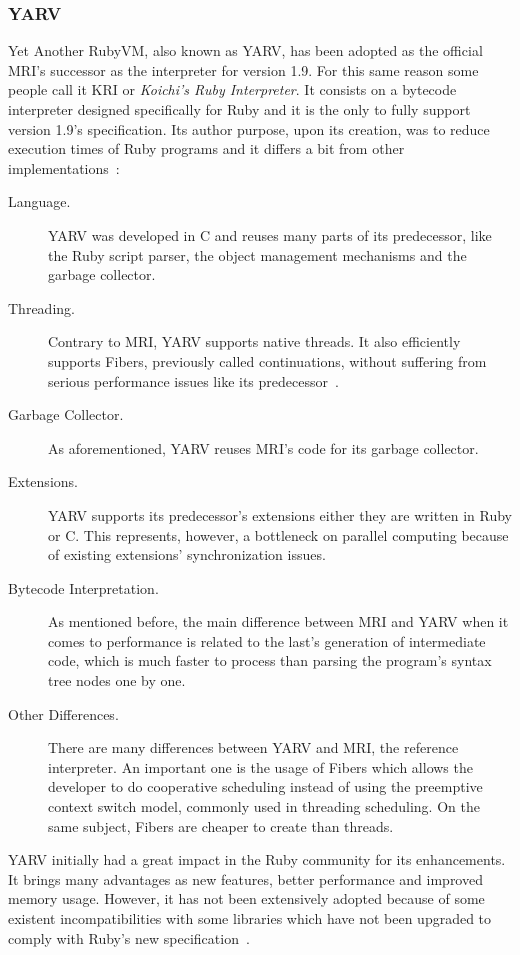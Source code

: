 \subsubsection{YARV}
Yet Another RubyVM, also known as YARV, has been adopted as the official MRI's successor as the interpreter for version 1.9. For this same reason some people call it KRI or \textit{Koichi's Ruby Interpreter}. It consists on a bytecode interpreter designed specifically for Ruby and it is the only to fully support version 1.9's specification. Its author purpose, upon its creation, was to reduce execution times of Ruby programs and it differs a bit from other implementations~\cite{yarv, rubyvm_interview, ruby_intermediate_language}:
\begin{description}
\item[Language.] YARV was developed in C and reuses many parts of its predecessor, like the Ruby script parser, the object management mechanisms and the garbage collector.
\item[Threading.] Contrary to MRI, YARV supports native threads. It also efficiently supports Fibers, previously called continuations, without suffering from serious performance issues like its predecessor~\cite{memory_leak_fix_18X}.
\item[Garbage Collector.]  As aforementioned, YARV reuses MRI's code for its garbage collector.
\item[Extensions.]  YARV supports its predecessor's extensions either they are written in Ruby or C. This represents, however, a bottleneck on parallel computing because of existing extensions' synchronization issues.
\item[Bytecode Interpretation.] As mentioned before, the main difference between MRI and YARV when it comes to performance is related to the last's generation of intermediate code, which is much faster to process than parsing the program's syntax tree nodes one by one.
\item[Other Differences.] There are many differences between YARV and MRI, the reference interpreter. An important one is the usage of Fibers which allows the developer to do cooperative scheduling instead of using the preemptive context switch model, commonly used in threading scheduling. On the same subject, Fibers are cheaper to create than threads. 
\end{description}
YARV initially had a great impact in the Ruby community for its enhancements. It brings many advantages as new features, better performance and improved memory usage. However, it has not been extensively adopted because of some existent incompatibilities with some libraries which have not been upgraded to comply with Ruby's new specification~\cite{rubys_challenge_2009}.


